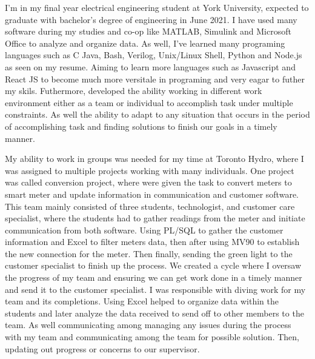 \documentclass[11pt, a4paper]{awesome-cv} %
\newcommand\tab[1][1cm]{\hspace*{#1}}
\begin{document}
\makecvheader %

\makelettertitle %


\begin{cvletter}



\tab I'm in my final year electrical engineering student at York University, expected to graduate with bachelor’s degree of engineering in June 2021. I have used many software during my studies and co-op like MATLAB, Simulink and Microsoft Office to analyze and organize data. As well, I've learned many programing languages such as C Java, Bash, Verilog, Unix/Linux Shell, Python and Node.js as seen on my resume. Aiming to learn more languages such as Javascript and React JS to become much more versitale in programing and very eagar to futher my skils. Futhermore, developed the ability working in different work environment either as a team or individual to accomplish task under multiple constraints. As well the ability to adapt to any situation that occurs in the period of accomplishing task and finding solutions to finish our goals in a timely manner.  

\tab My ability to work in groups was needed for my time at Toronto Hydro, where I was assigned to multiple projects working with many individuals. One project was called conversion project, where were given the task to convert meters to smart meter and update information in communication and customer software. This team mainly consisted of three students, technologist, and customer care specialist, where the students had to gather readings from the meter and initiate communication from both software. Using PL/SQL to gather the customer information and Excel to filter meters data, then after using MV90 to establish the new connection for the meter. Then finally, sending the green light to the customer specialist to finish up the process. We created a cycle where I oversaw the progress of my team and ensuring we can get work done in a timely manner and send it to the customer specialist. I was responsible with diving work for my team and its completions. Using Excel helped to organize data within the students and later analyze the data received to send off to other members to the team. As well communicating among managing any issues during the process with my team and communicating among the team for possible solution. Then, updating out progress or concerns to our supervisor.


\end{cvletter}
\end{document}
